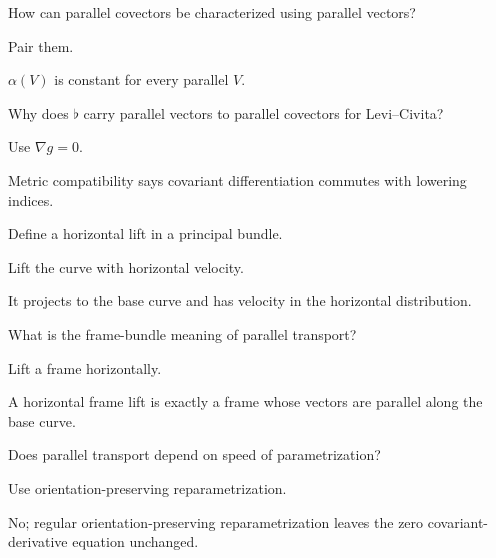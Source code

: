\begin{exercise}\label{exr:vii24-19}
How can parallel covectors be characterized using parallel vectors?
\end{exercise}
\begin{hint}
Pair them.
\end{hint}
\begin{solution}
\(\alpha(V)\) is constant for every parallel \(V\).
\end{solution}


\begin{exercise}\label{exr:vii24-20}
Why does \(\flat\) carry parallel vectors to parallel covectors for Levi--Civita?
\end{exercise}
\begin{hint}
Use \(\nabla g=0\).
\end{hint}
\begin{solution}
Metric compatibility says covariant differentiation commutes with lowering indices.
\end{solution}


\begin{exercise}\label{exr:vii24-21}
Define a horizontal lift in a principal bundle.
\end{exercise}
\begin{hint}
Lift the curve with horizontal velocity.
\end{hint}
\begin{solution}
It projects to the base curve and has velocity in the horizontal distribution.
\end{solution}


\begin{exercise}\label{exr:vii24-22}
What is the frame-bundle meaning of parallel transport?
\end{exercise}
\begin{hint}
Lift a frame horizontally.
\end{hint}
\begin{solution}
A horizontal frame lift is exactly a frame whose vectors are parallel along the base curve.
\end{solution}


\begin{exercise}\label{exr:vii24-23}
Does parallel transport depend on speed of parametrization?
\end{exercise}
\begin{hint}
Use orientation-preserving reparametrization.
\end{hint}
\begin{solution}
No; regular orientation-preserving reparametrization leaves the zero covariant-derivative equation unchanged.
\end{solution}


